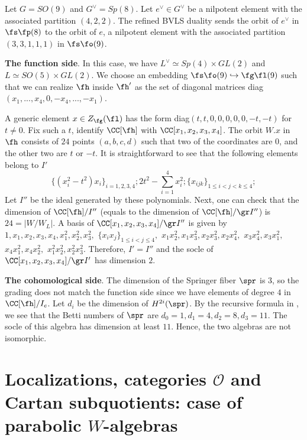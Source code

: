 \documentclass[12pt]{amsart}
\begin{document}
\begin{example} \label{gl3gl1}
Let $G= SO(9)$ and $G^\vee= Sp(8)$. Let $e^\vee\in G^\vee$ be a nilpotent element with the associated partition $(4,2,2)$. The refined BVLS duality sends the orbit of $e^\vee$ in $\fs\fp(8)$ to the orbit of $e$, a nilpotent element with the associated partition $(3,3,1,1,1)$ in $\fs\fo(9)$.

\textbf{The function side}. In this case, we have $L^\vee \simeq Sp(4)\times GL(2)$ and $L\simeq SO(5)\times GL(2)$. We choose an embedding $\fs\fo(9)\hookrightarrow \fg\fl(9)$ such that we can realize $\fh$ inside $\fh'$ as the set of diagonal matrices diag$(x_1,...,x_4,0,-x_4,...,-x_1)$.

A generic element $x\in Z_\fg(\fl)$ has the form diag$(t,t,0,0,0,0,0,-t,-t)$ for $t\neq 0$. Fix such a $t$, identify $\CC[\fh]$ with $\CC[x_1,x_2,x_3,x_4]$. The orbit $W.x$ in $\fh$ consists of $24$ points $(a,b,c,d)$ such that two of the coordinates are 0, and the other two are $t$ or $-t$. It is straightforward to see that the following elements belong to $I'$ 
$$\{(x_i^2- t^2)x_i\}_{i=1,2,3,4}; 2t^2- \sum_{i=1}^4 x_i^{2}; \{x_{ijk}\}_{1\leqslant i<j<k \leqslant 4};  $$
Let $I''$ be the ideal generated by these polynomials. Next, one can check that the dimension of $\CC[\fh]/I''$ (equals to the dimension of $\CC[\fh]/\gr I''$)  is $24=|W/W_L|$. A basis of $\CC[x_1,x_2,x_3,x_4]/\gr I''$ is given by $1, x_1, x_2, x_3, x_4, x_1^{2}, x_2^{2}, x_3^{2},$ $ \{x_ix_j\}_{1\leqslant i<j \leqslant 4},$ $ x_1x_2^{2}, x_1x_3^{2}, x_2x_3^{2}, x_2x_4^{2},$ $ x_3x_4^{2}, x_3x_1^{2},$ $ x_4x_1^{2}, x_4x_2^{2},$ $ x_1^{2}x_2^{2}, x_2^{2}x_3^{2}$. Therefore, $I'=I''$ and the socle of $\CC[x_1,x_2,x_3,x_4]/\gr I'$ has dimension $2$.

\textbf{The cohomological side}. The dimension of the Springer fiber $\spr$ is $3$, so the grading does not match the function side since we have elements of degree $4$ in $\CC[\fh]/I_e$. Let $d_i$ be the dimension of $H^{2i}(\spr)$. By the recursive formula in \cite[Theorem 6.1]{Kim2018}, we see that the Betti numbers of $\spr$ are $d_0= 1, d_1= 4, d_2=8 ,d_3= 11$. The socle of this algebra has dimension at least $11$. Hence, the two algebras are not isomorphic.

\end{example}




\section{Localizations, categories $\mathcal{O}$ and Cartan subquotients: case of parabolic $W$-algebras}\label{sec_hw_parab}
\end{document}
